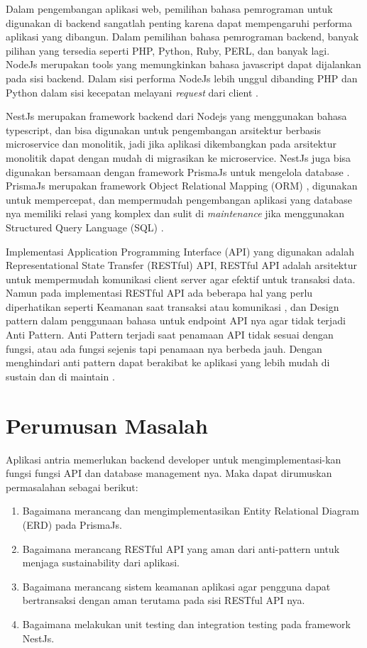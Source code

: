 Dalam pengembangan aplikasi web, pemilihan bahasa pemrograman untuk digunakan di backend sangatlah penting karena dapat mempengaruhi performa aplikasi yang dibangun. Dalam pemilihan bahasa pemrograman backend, banyak pilihan yang tersedia seperti PHP, Python, Ruby, PERL, dan banyak lagi. NodeJs merupakan tools yang memungkinkan bahasa javascript dapat dijalankan pada sisi backend. Dalam sisi performa NodeJs lebih unggul dibanding PHP dan Python dalam sisi kecepatan melayani \textit{request} dari client \cite{William2020} \cite{Odeniran2023}.

NestJs merupakan framework backend dari Nodejs yang menggunakan bahasa typescript, dan bisa digunakan untuk pengembangan arsitektur berbasis microservice dan monolitik, jadi jika aplikasi dikembangkan pada arsitektur monolitik dapat dengan mudah di migrasikan ke microservice. NestJs juga bisa digunakan bersamaan dengan framework PrismaJs untuk mengelola database \cite{NestJS}. PrismaJs merupakan framework Object Relational Mapping (ORM) \cite{Prisma}, digunakan untuk mempercepat, dan mempermudah pengembangan aplikasi yang database nya memiliki relasi yang komplex dan sulit di \textit{maintenance} jika menggunakan Structured Query Language (SQL) \cite{Zmaranda2020}.

Implementasi Application Programming Interface (API) yang digunakan adalah Representational State Transfer (RESTful) API, RESTful API adalah arsitektur untuk mempermudah komunikasi client server agar efektif untuk transaksi data. Namun pada implementasi RESTful API ada beberapa hal yang perlu diperhatikan seperti Keamanan saat transaksi  atau komunikasi \cite{Beer2018}, dan Design pattern dalam penggunaan bahasa untuk endpoint API nya agar tidak terjadi Anti Pattern. Anti Pattern terjadi saat penamaan API tidak sesuai dengan fungsi, atau ada fungsi sejenis tapi penamaan nya berbeda jauh. Dengan menghindari anti pattern dapat berakibat ke aplikasi yang lebih mudah di sustain dan di maintain \cite{Aghajani2018} \cite{Alshraiedeh2021}.

\section{Perumusan Masalah}
Aplikasi antria memerlukan backend developer untuk mengimplementasi-kan fungsi fungsi API dan database management nya. Maka dapat dirumuskan permasalahan sebagai berikut:
\begin{enumerate}
  \item Bagaimana merancang dan mengimplementasikan Entity Relational Diagram (ERD) pada PrismaJs.
  \item Bagaimana merancang RESTful API yang aman dari anti-pattern untuk menjaga sustainability dari aplikasi.
  \item Bagaimana merancang sistem keamanan aplikasi agar pengguna dapat bertransaksi dengan aman terutama pada sisi RESTful API nya.
  \item Bagaimana melakukan unit testing dan integration testing pada framework NestJs.
\end{enumerate}


